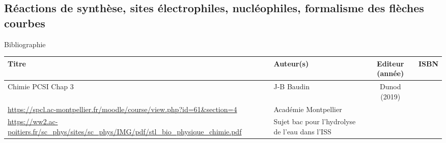 \begin{headerBlock}
\chapter{Réactions de synthèse, sites électrophiles, nucléophiles, formalisme des flèches courbes}
\label{LC_ReactionSynthese_SPCL}
 \end{headerBlock}



\begin{reportBlock}{Bibliographie}

\begin{center}
\begin{tabularx}{\textwidth}{| X | X | c | c |}\hline
Titre & Auteur(s) & Editeur (année) & ISBN \\ \hline
 Chimie PCSI Chap 3 & J-B Baudin & Dunod (2019) &  \\ 
 \hline
 \url{https://spcl.ac-montpellier.fr/moodle/course/view.php?id=61&section=4} & Académie Montpellier & & \\
 \hline
 \url{https://ww2.ac-poitiers.fr/sc_phys/sites/sc_phys/IMG/pdf/stl_bio_physique_chimie.pdf} & Sujet bac pour l'hydrolyse de l'eau dans l'ISS & & \\
\end{tabularx}
\end{center}

\end{reportBlock}

